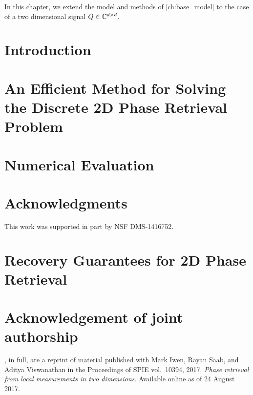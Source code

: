 \label{ch:2d_base_model}

In this chapter, we extend the model and methods of \cref{ch:base_model} to the case of a two dimensional signal $Q \in \mathbb{C}^{d \times d}$.

\section{Introduction}
\label{sec:2d_intro}


\section{An Efficient Method for Solving the Discrete 2D Phase Retrieval Problem}
\label{sec:2d_method}


\section{Numerical Evaluation}
\label{sec:2d_num}


\section*{Acknowledgments} %
 
This work was supported in part by NSF DMS-1416752.%

\section{Recovery Guarantees for 2D Phase Retrieval}
\label{sec:2d_recov}


\section*{Acknowledgement of joint authorship}

, in full, are a reprint of material published with Mark Iwen, Rayan Saab, and Aditya Viswanathan in the Proceedings of SPIE vol.~10394, 2017.  \emph{Phase retrieval from local measurements in two dimensions}.  Available online as of 24 August 2017.
